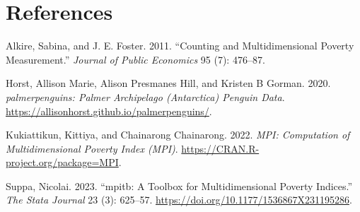 \hypertarget{references}{%
\section*{References}\label{references}}

\hypertarget{refs}{}
\begin{CSLReferences}{1}{0}
\leavevmode{}%
Alkire, Sabina, and J. E. Foster. 2011. {``Counting and Multidimensional Poverty Measurement.''} \emph{Journal of Public Economics} 95 (7): 476--87.

\leavevmode{}%
Horst, Allison Marie, Alison Presmanes Hill, and Kristen B Gorman. 2020. \emph{{palmerpenguins}: Palmer Archipelago (Antarctica) Penguin Data}. \url{https://allisonhorst.github.io/palmerpenguins/}.

\leavevmode{}%
Kukiattikun, Kittiya, and Chainarong Chainarong. 2022. \emph{MPI: Computation of Multidimensional Poverty Index (MPI)}. \url{https://CRAN.R-project.org/package=MPI}.

\leavevmode{}%
Suppa, Nicolai. 2023. {``{m}pitb: A Toolbox for Multidimensional Poverty Indices.''} \emph{The Stata Journal} 23 (3): 625--57. \url{https://doi.org/10.1177/1536867X231195286}.

\end{CSLReferences}



\address{%
Ignacio Girela\\
CONICET - Universidad Nacional de Córdoba\\%
Facultad de Ciencias Económicas\\ Córdoba, Argentina\\
%
\url{https://www.eco.unc.edu.ar/}\\%
\textit{ORCiD: \href{https://orcid.org/0000-0003-3297-3854}{0000-0003-3297-3854}}\\%
\href{mailto:ignacio.girela@unc.edu.ar}{\nolinkurl{ignacio.girela@unc.edu.ar}}%
}
